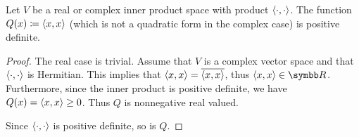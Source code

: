 \begin{lemma}\label{thm:inner_product_quadratic_form_is_positive_definite}
  Let \( V \) be a real or complex inner product space with product \( \left\langle \cdot, \cdot \right\rangle \). The function \( Q(x) \coloneqq \left\langle x, x \right\rangle \) (which is not a quadratic form in the complex case) is positive definite.
\end{lemma}
\begin{proof}
  The real case is trivial. Assume that \( V \) is a complex vector space and that \( \left\langle \cdot, \cdot \right\rangle \) is Hermitian. This implies that \( \left\langle x, x \right\rangle = \overline{\left\langle x, x \right\rangle} \), thus \( \Prod x x \in \BR \). Furthermore, since the inner product is positive definite, we have \( Q(x) = \left\langle x, x \right\rangle \geq 0 \). Thus \( Q \) is nonnegative real valued.

  Since \( \left\langle \cdot, \cdot \right\rangle \) is positive definite, so is \( Q \).
\end{proof}

